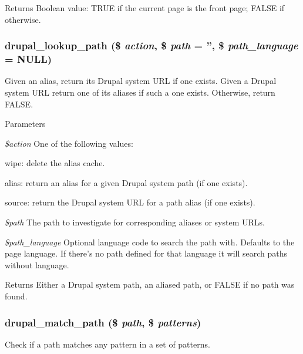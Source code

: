 \begin{DoxyReturn}{Returns}
Boolean value: TRUE if the current page is the front page; FALSE if otherwise. 
\end{DoxyReturn}
\hypertarget{path_8inc_a3c1a94088895986eedd4358367355e33}{
\subsubsection[{drupal\_\-lookup\_\-path}]{\setlength{\rightskip}{0pt plus 5cm}drupal\_\-lookup\_\-path (\$ {\em action}, \/  \$ {\em path} = {\ttfamily ''}, \/  \$ {\em path\_\-language} = {\ttfamily NULL})}}
\label{path_8inc_a3c1a94088895986eedd4358367355e33}
Given an alias, return its Drupal system URL if one exists. Given a Drupal system URL return one of its aliases if such a one exists. Otherwise, return FALSE.


\begin{DoxyParams}{Parameters}
\item[{\em \$action}]One of the following values:
\begin{DoxyItemize}
\item wipe: delete the alias cache.
\item alias: return an alias for a given Drupal system path (if one exists).
\item source: return the Drupal system URL for a path alias (if one exists). 
\end{DoxyItemize}\item[{\em \$path}]The path to investigate for corresponding aliases or system URLs. \item[{\em \$path\_\-language}]Optional language code to search the path with. Defaults to the page language. If there's no path defined for that language it will search paths without language.\end{DoxyParams}
\begin{DoxyReturn}{Returns}
Either a Drupal system path, an aliased path, or FALSE if no path was found. 
\end{DoxyReturn}
\hypertarget{path_8inc_a1299e390360982cc8fbebe06f0232e18}{
\subsubsection[{drupal\_\-match\_\-path}]{\setlength{\rightskip}{0pt plus 5cm}drupal\_\-match\_\-path (\$ {\em path}, \/  \$ {\em patterns})}}
\label{path_8inc_a1299e390360982cc8fbebe06f0232e18}
Check if a path matches any pattern in a set of patterns.


